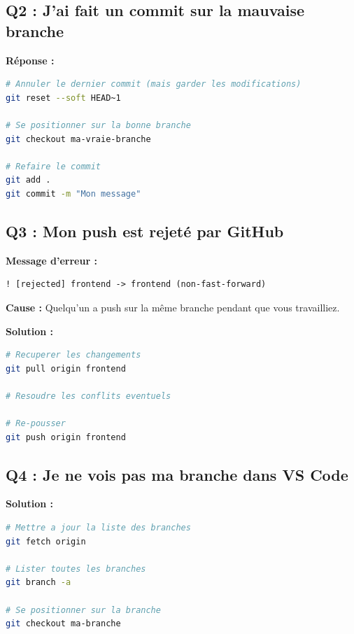 \documentclass[11pt,a4paper]{article}
\begin{document}
\subsection{Q2 : J'ai fait un commit sur la mauvaise branche}

\textbf{Réponse :}

\begin{lstlisting}[language=bash]
# Annuler le dernier commit (mais garder les modifications)
git reset --soft HEAD~1

# Se positionner sur la bonne branche
git checkout ma-vraie-branche

# Refaire le commit
git add .
git commit -m "Mon message"
\end{lstlisting}

\subsection{Q3 : Mon push est rejeté par GitHub}

\textbf{Message d'erreur :}
\begin{lstlisting}
! [rejected] frontend -> frontend (non-fast-forward)
\end{lstlisting}

\textbf{Cause :} Quelqu'un a push sur la même branche pendant que vous travailliez.

\textbf{Solution :}

\begin{lstlisting}[language=bash]
# Recuperer les changements
git pull origin frontend

# Resoudre les conflits eventuels

# Re-pousser
git push origin frontend
\end{lstlisting}

\subsection{Q4 : Je ne vois pas ma branche dans VS Code}

\textbf{Solution :}

\begin{lstlisting}[language=bash]
# Mettre a jour la liste des branches
git fetch origin

# Lister toutes les branches
git branch -a

# Se positionner sur la branche
git checkout ma-branche
\end{lstlisting}

\clearpage
\end{document}
